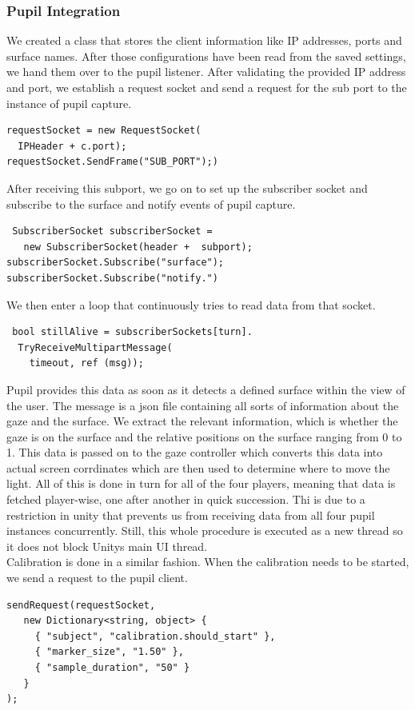 \documentclass{sigchi}
\begin{document}
\subsubsection{Pupil Integration}
We created a class that stores the client information like IP addresses, ports and surface names. After those configurations have been read from the saved settings, we hand them over to the pupil listener. After validating the provided IP address and port, we establish a request socket and send a request for the sub port to the instance of pupil capture. 
\begin{verbatim}
requestSocket = new RequestSocket(
  IPHeader + c.port); 
requestSocket.SendFrame("SUB_PORT");)
\end{verbatim}

 After receiving this subport, we go on to set up the subscriber socket and subscribe to the surface and notify events of pupil capture. 
  \begin{verbatim}
 SubscriberSocket subscriberSocket = 
   new SubscriberSocket(header +  subport); 
subscriberSocket.Subscribe("surface");
subscriberSocket.Subscribe("notify.")
\end{verbatim}
 
We then enter a loop that continuously tries to read data from that socket.
 \begin{verbatim}
 bool stillAlive = subscriberSockets[turn].
  TryReceiveMultipartMessage(
    timeout, ref (msg));
\end{verbatim}

  Pupil provides this data as soon as it detects a defined surface within the view of the user. The message is a json file containing all sorts of information about the gaze and the surface. We extract the relevant information, which is whether the gaze is on the surface and the relative positions on the surface ranging from 0 to 1. This data is passed on to the gaze controller which converts this data into actual screen corrdinates which are then used to determine where to move the light. All of this is done in turn for all of the four players, meaning that data is fetched player-wise, one after another in quick succession. Thi is due to a restriction in unity that prevents us from receiving data from all four pupil instances concurrently. Still, this whole procedure is executed as a new thread so it does not block Unitys main UI thread.\\
Calibration is done in a similar fashion. When the calibration needs to be started, we send a request to the pupil client.
 \begin{verbatim}
sendRequest(requestSocket,
   new Dictionary<string, object> { 
     { "subject", "calibration.should_start" }, 
     { "marker_size", "1.50" }, 
     { "sample_duration", "50" } 
   }
);
\end{verbatim}
\end{document}
